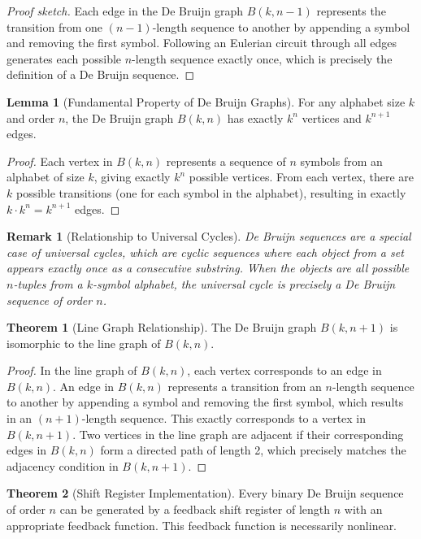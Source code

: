 \documentclass{article}
\newtheorem{remark}{Remark}
\theoremstyle{definition}
\newtheorem{theorem}{Theorem}
\newtheorem{lemma}{Lemma}
\begin{document}
\begin{proof}[Proof sketch]
Each edge in the De Bruijn graph $B(k,n-1)$ represents the transition from one $(n-1)$-length sequence to another by appending a symbol and removing the first symbol. Following an Eulerian circuit through all edges generates each possible $n$-length sequence exactly once, which is precisely the definition of a De Bruijn sequence.
\end{proof}
\begin{lemma}[Fundamental Property of De Bruijn Graphs]
For any alphabet size $k$ and order $n$, the De Bruijn graph $B(k,n)$ has exactly $k^n$ vertices and $k^{n+1}$ edges.
\end{lemma}
\begin{proof}
Each vertex in $B(k,n)$ represents a sequence of $n$ symbols from an alphabet of size $k$, giving exactly $k^n$ possible vertices. From each vertex, there are $k$ possible transitions (one for each symbol in the alphabet), resulting in exactly $k \cdot k^n = k^{n+1}$ edges.
\end{proof}
\begin{remark}[Relationship to Universal Cycles]
De Bruijn sequences are a special case of universal cycles, which are cyclic sequences where each object from a set appears exactly once as a consecutive substring. When the objects are all possible $n$-tuples from a $k$-symbol alphabet, the universal cycle is precisely a De Bruijn sequence of order $n$.
\end{remark}
\begin{theorem}[Line Graph Relationship]
The De Bruijn graph $B(k,n+1)$ is isomorphic to the line graph of $B(k,n)$.
\end{theorem}

\begin{proof}
In the line graph of $B(k,n)$, each vertex corresponds to an edge in $B(k,n)$. An edge in $B(k,n)$ represents a transition from an $n$-length sequence to another by appending a symbol and removing the first symbol, which results in an $(n+1)$-length sequence. This exactly corresponds to a vertex in $B(k,n+1)$. Two vertices in the line graph are adjacent if their corresponding edges in $B(k,n)$ form a directed path of length 2, which precisely matches the adjacency condition in $B(k,n+1)$.
\end{proof}
\begin{theorem}[Shift Register Implementation]
Every binary De Bruijn sequence of order $n$ can be generated by a feedback shift register of length $n$ with an appropriate feedback function. This feedback function is necessarily nonlinear.
\end{theorem}
\end{document}
